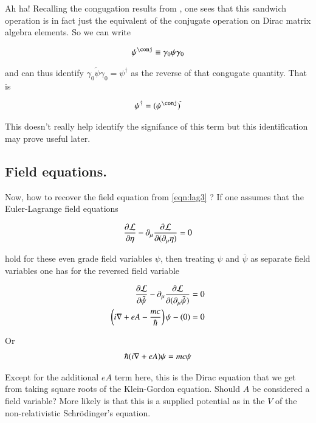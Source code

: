\documentclass{article}
\begin{document}
Ah ha!  Recalling the congugation results from \cite{PJDiracGamma}, one sees that this sandwich operation is in fact just the equivalent of the conjugate operation on Dirac matrix algebra elements.  So we can write

\begin{align*}
\psi^\conj \equiv \gamma_0 \psi \gamma_0
\end{align*}

and can thus identify $\gamma_0 \tilde{\psi} \gamma_0 = \psi^\dagger$ as the reverse of that congugate quantity.  That is

\begin{align*}
\psi^\dagger = (\psi^\conj)^{\tilde{}}
\end{align*}

This doesn't really help identify the signifance of this term but this identification may prove useful later.

\subsection{ Field equations. }

Now, how to recover the field equation from \ref{eqn:lag3} 
?  If one assumes that the Euler-Lagrange field equations

\begin{align*}
\frac{\partial {\mathcal{L}}}{\partial {\eta}} - \partial_\mu \frac{\partial {\mathcal{L}}}{\partial {(\partial_\mu \eta)}} = 0
\end{align*}

hold for these even grade field variables $\psi$, then treating $\psi$ and $\bar \psi$ as separate field variables one has for the reversed field variable

\begin{align*}
\frac{\partial {\mathcal{L}}}{\partial {\tilde{\psi}}} - \partial_\mu \frac{\partial {\mathcal{L}}}{\partial {(\partial_\mu \tilde{\psi})}} &= 0 \\
\left( i \nabla + e A - \frac{mc}{\hbar}\right) \psi - (0) &= 0
\end{align*}

Or 
\begin{align*}
\hbar (i \nabla + e A) \psi = mc \psi
\end{align*}

Except for the additional $e A$ term here, this is the Dirac equation that we get from taking square roots of the Klein-Gordon equation.  Should $A$ be considered a field variable?  More likely is that this is a supplied potential as in the $V$ of the non-relativistic 
Schr\"{o}dinger's equation.
\end{document}
